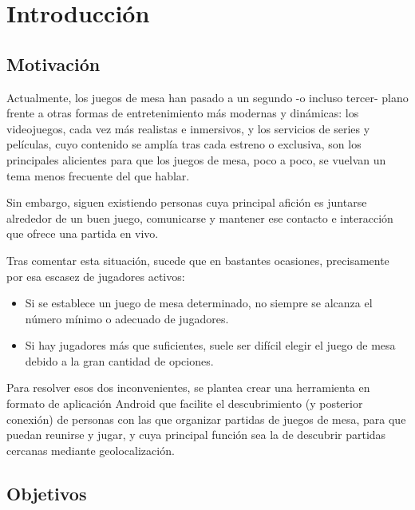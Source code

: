 \chapter{Introducción}

    \section{Motivación}
    \label{intro:motiv}

        Actualmente, los juegos de mesa han pasado a un segundo -o incluso tercer- plano frente a otras formas de entretenimiento más modernas y dinámicas: los videojuegos, cada vez más realistas e inmersivos, y los servicios de series y películas, cuyo contenido se amplía tras cada estreno o exclusiva, son los principales alicientes para que los juegos de mesa, poco a poco, se vuelvan un tema menos frecuente del que hablar.


        Sin embargo, siguen existiendo personas cuya principal afición es juntarse alrededor de un buen juego, comunicarse y mantener ese contacto e interacción que ofrece una partida en vivo.

        Tras comentar esta situación, sucede que en bastantes ocasiones, precisamente por esa escasez de jugadores activos:

        \begin{itemize}

            \item Si se establece un juego de mesa determinado, no siempre se alcanza el número mínimo o adecuado de jugadores.
            \item Si hay jugadores más que suficientes, suele ser difícil elegir el juego de mesa debido a la gran cantidad de opciones.

        \end{itemize}

        Para resolver esos dos inconvenientes, se plantea crear una herramienta en formato de aplicación Android que facilite el descubrimiento (y posterior conexión) de personas con las que organizar partidas de juegos de mesa, para que puedan reunirse y jugar, y cuya principal función sea la de descubrir partidas cercanas mediante geolocalización.

        \newpage


    \section{Objetivos}

